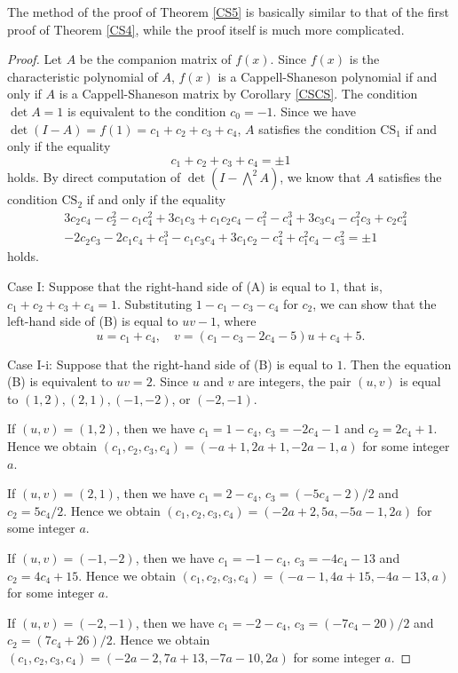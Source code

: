 \documentclass{amsart}
\theoremstyle{plain}
\theoremstyle{definition}
\theoremstyle{remark}
\begin{document}
The method of the proof of Theorem \ref{CS5} is basically similar to that of 
the first proof of Theorem \ref{CS4}, while the proof itself is much more complicated. 

\begin{proof}
Let $A$ be the companion matrix of $f(x)$. 
Since $f(x)$ is the characteristic polynomial of $A$, $f(x)$ is a Cappell-Shaneson polynomial 
if and only if $A$ is a Cappell-Shaneson matrix by Corollary \ref{CSCS}. 
The condition $\det A=1$ is equivalent to the condition $c_0=-1$. 
Since we have $\det(I-A)=f(1)=c_1+c_2+c_3+c_4$, 
$A$ satisfies the condition $\mathrm{CS}_1$ if and only if the equality 
\begin{equation}
c_1+c_2+c_3+c_4=\pm 1 \tag{A}
\end{equation}
holds. 
By direct computation of $\det(I-\bigwedge^2A)$, 
we know that $A$ satisfies the condition $\mathrm{CS}_2$ if and only if the equality 
\begin{equation}
\begin{split}
& 3c_2c_4-c_2^2-c_1c_4^2+3c_1c_3+c_1c_2c_4-c_1^2-c_4^3+3c_3c_4
-c_1^2c_3+c_2c_4^2 \\
& -2c_2c_3-2c_1c_4+c_1^3-c_1c_3c_4+3c_1c_2
-c_4^2+c_1^2c_4-c_3^2=\pm 1 
\end{split}\tag{B}
\end{equation}
holds. 

Case I: 
Suppose that the right-hand side of (A) is equal to $1$, that is, $c_1+c_2+c_3+c_4=1$. 
Substituting $1-c_1-c_3-c_4$ for $c_2$, we can show that the left-hand side of (B) 
is equal to $uv-1$, 
where
\[
u=c_1+c_4,\quad 
v=(c_1-c_3-2c_4-5)u+c_4+5. 
\]

Case I-i: 
Suppose that the right-hand side of (B) is equal to $1$. 
Then the equation (B) is equivalent to $uv=2$. 
Since $u$ and $v$ are integers, the pair $(u,v)$ is equal to $(1,2), (2,1), (-1,-2)$, or $(-2,-1)$. 

If $(u,v)=(1,2)$, then we have $c_1=1-c_4$, $c_3=-2c_4-1$ and $c_2=2c_4+1$. 
Hence we obtain 
$(c_1,c_2,c_3,c_4)=(-a+1,2a+1,-2a-1,a)$
for some integer $a$. 

If $(u,v)=(2,1)$, then we have $c_1=2-c_4$, $c_3=(-5c_4-2)/2$ and $c_2=5c_4/2$. 
Hence we obtain 
$(c_1,c_2,c_3,c_4)=(-2a+2,5a,-5a-1,2a)$ 
for some integer $a$. 

If $(u,v)=(-1,-2)$, then we have $c_1=-1-c_4$, $c_3=-4c_4-13$ and $c_2=4c_4+15$. 
Hence we obtain 
$(c_1,c_2,c_3,c_4)=(-a-1,4a+15,-4a-13,a)$ 
for some integer $a$. 

If $(u,v)=(-2,-1)$, then we have $c_1=-2-c_4$, $c_3=(-7c_4-20)/2$ and $c_2=(7c_4+26)/2$. 
Hence we obtain 
$(c_1,c_2,c_3,c_4)=(-2a-2,7a+13,-7a-10,2a)$ 
for some integer $a$. 


\end{proof}
\end{document}
